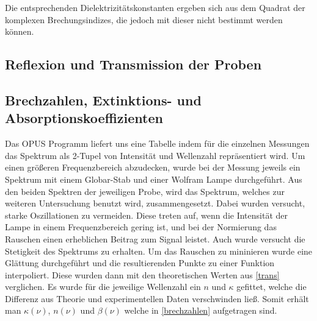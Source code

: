 \documentclass[paper=a4,fontsize=10pt,DIV=18,twocolumn,parskip=half]{scrartcl}
\numberwithin{equation}{section}    %
\begin{document}
Die entsprechenden Dielektrizitätskonstanten ergeben sich aus dem Quadrat der 
komplexen Brechungsindizes, die jedoch mit dieser nicht bestimmt werden können.

\subsection{Reflexion und Transmission der Proben}

\subsection{Brechzahlen, Extinktions- und Absorptionskoeffizienten}

Das OPUS Programm liefert uns eine Tabelle indem für die einzelnen Messungen das 
Spektrum als 2-Tupel von Intensität und Wellenzahl repräsentiert wird. Um einen 
größeren Frequenzbereich abzudecken, wurde bei der Messung jeweils ein Spektrum 
mit einem Globar-Stab und einer Wolfram Lampe durchgeführt. Aus den beiden 
Spektren der jeweiligen Probe, wird das Spektrum, welches zur weiteren 
Untersuchung benutzt wird, zusammengesetzt. Dabei wurden versucht, starke 
Oszillationen zu vermeiden. Diese treten auf, wenn die Intensität der Lampe in 
einem Frequenzbereich gering ist, und bei der Normierung das Rauschen einen 
erheblichen Beitrag zum Signal leistet. Auch wurde versucht die Stetigkeit des 
Spektrums zu erhalten. Um das Rauschen zu mininieren wurde eine Glättung 
durchgeführt und die resultierenden Punkte zu einer Funktion interpoliert. Diese 
wurden dann mit den theoretischen Werten aus \cref{trans} verglichen. Es wurde 
für die jeweilige Wellenzahl ein $n$ und $\kappa$ gefittet, welche die Differenz 
aus Theorie und experimentellen Daten verschwinden ließ. Somit erhält man 
$\kappa(\nu)$, $n(\nu)$ und $\beta(\nu)$ welche in \cref{brechzahlen} 
aufgetragen sind. 
\end{document}
